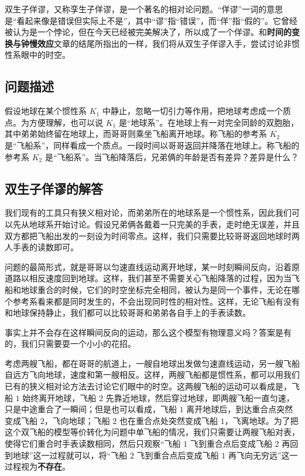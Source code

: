 

双生子佯谬，又称孪生子佯谬，是一个著名的相对论问题。“佯谬”一词的意思是“看起来像是错误但实际上不是”，其中“谬”指“错误”，而“佯”指“假的”。它曾经被认为是一个悖论，但在今天已经被完美解决了，所以成了一个佯谬。和\textbf{时间的变换与钟慢效应}文章的结尾所指出的一样，我们将从双生子佯谬入手，尝试讨论非惯性系眼中的时空。

\subsection{问题描述}

假设地球在某个惯性系 $K_1$ 中静止，忽略一切引力等作用，把地球考虑成一个质点。为方便理解，也可以说 $K_1$ 是“地球系”。在地球上有一对完全同龄的双胞胎，其中弟弟始终留在地球上，而哥哥则乘坐飞船离开地球。称飞船的参考系 $K_2$ 是“飞船系”，同样看成一个质点。一段时间以哥哥返回并降落在地球上。称飞船的参考系 $K_2$ 是“飞船系”。当飞船降落后，兄弟俩的年龄是否有差异？差异是什么？

\subsection{双生子佯谬的解答}

我们现有的工具只有狭义相对论，而弟弟所在的地球系是一个惯性系，因此我们可以先从地球系开始讨论。假设兄弟俩各戴着一只完美的手表，走时绝无误差，并且双方都把飞船出发的一刻设为时间零点。这样，我们只需要比较哥哥返回地球时两人手表的读数即可。

问题的最简形式，就是哥哥以匀速直线运动离开地球，某一时刻瞬间反向，沿着原道路以相反速度回到地球。这样，我们甚至不需要关心飞船降落的过程，因为当飞船和地球重合的时候，它们的时空坐标完全相同，被认为是同一个事件，无论在哪个参考系看来都是同时发生的，不会出现同时性的相对性。这样，无论飞船有没有和地球保持静止，我们都可以比较哥哥和弟弟各自手上的手表读数。

事实上并不会存在这样瞬间反向的运动，那么这个模型有物理意义吗？答案是有的，我们只需要耍一个小小的花招。

考虑两艘飞船，都在哥哥的航道上，一艘自地球出发做匀速直线运动，另一艘飞船自远方飞向地球，速度和第一艘相反。这样，两艘飞船都是惯性系，都可以用我们已有的狭义相对论方法去讨论它们眼中的时空。这两艘飞船的运动可以看成是，飞船 $1$ 始终离开地球，飞船 $2$ 先靠近地球，然后穿过地球，即两艘飞船一直匀速，只是中途重合了一瞬间；但是也可以看成，飞船 $1$ 离开地球后，到达重合点突然变成飞船 $2$，飞向地球；飞船 $2$ 也在重合点处突然变成飞船 $1$，飞离地球。为了把这个双飞船的模型等价转化为问题中单飞船的情况，我们只需要让两艘飞船对表，使得它们重合时手表读数相同，然后只观察“飞船 $1$ 飞到重合点后变成飞船 $2$ 再回到地球”这一过程就可以，将“飞船 $2$ 飞到重合点后变成飞船 $1$ 再飞向无穷远”这一过程视为\textbf{不存在}。

